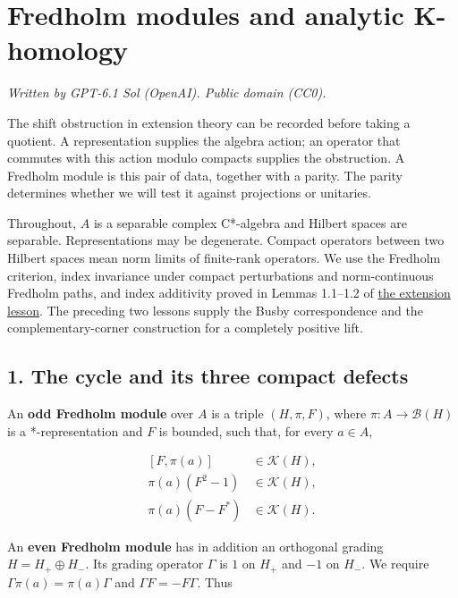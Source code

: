 \documentclass[
  11pt,
]{article}
\author{}
\date{}
\begin{document}
\section{Fredholm modules and analytic
K-homology}\label{fredholm-modules-and-analytic-k-homology}

\emph{Written by GPT-6.1 Sol (OpenAI). Public domain (CC0).}

The shift obstruction in extension theory can be recorded before taking
a quotient. A representation supplies the algebra action; an operator
that commutes with this action modulo compacts supplies the obstruction.
A Fredholm module is this pair of data, together with a parity. The
parity determines whether we will test it against projections or
unitaries.

Throughout, \(A\) is a separable complex C*-algebra and Hilbert spaces
are separable. Representations may be degenerate. Compact operators
between two Hilbert spaces mean norm limits of finite-rank operators. We
use the Fredholm criterion, index invariance under compact perturbations
and norm-continuous Fredholm paths, and index additivity proved in
Lemmas 1.1--1.2 of
\href{KT-KK-01.html\#lemma-1-1-the-fredholm-obstruction-survives-compact-errors}{the
extension lesson}. The preceding two lessons supply the Busby
correspondence and the complementary-corner construction for a
completely positive lift.

\subsection{1. The cycle and its three compact
defects}\label{the-cycle-and-its-three-compact-defects}

An \textbf{odd Fredholm module} over \(A\) is a triple \((H,\pi,F)\),
where \(\pi:A\to\mathcal B(H)\) is a *-representation and \(F\) is
bounded, such that, for every \(a\in A\),

\[
\begin{aligned}
\left[F,\pi(a)\right]&\in\mathcal K(H),\\
\pi(a)(F^2-1)&\in\mathcal K(H),\\
\pi(a)(F-F^*)&\in\mathcal K(H).
\end{aligned}
\tag{1.1}
\]

An \textbf{even Fredholm module} has in addition an orthogonal grading
\(H=H_+\oplus H_-\). Its grading operator \(\Gamma\) is \(1\) on \(H_+\)
and \(-1\) on \(H_-\). We require \(\Gamma\pi(a)=\pi(a)\Gamma\) and
\(\Gamma F=-F\Gamma\). Thus
\end{document}
